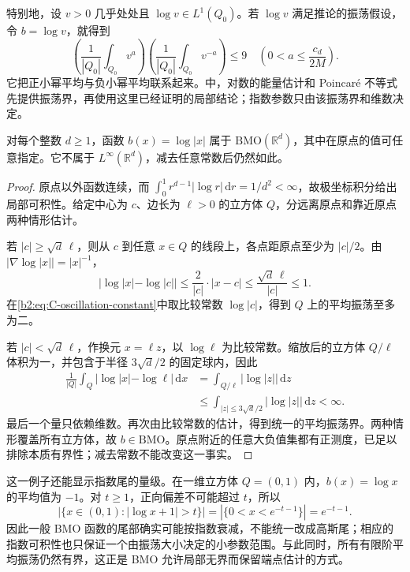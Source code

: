 特别地，设 \(v>0\) 几乎处处且 \(\log v\in L^1(Q_0)\)。若 \(\log v\) 满足推论的振荡假设，令 \(b=\log v\)，就得到
\[
 \left(\frac1{|Q_0|}\int_{Q_0}v^a\right)
 \left(\frac1{|Q_0|}\int_{Q_0}v^{-a}\right)\leq9
 \quad\left(0<a\leq\frac{c_d}{2M}\right).
\]
它把正小幂平均与负小幂平均联系起来。中，对数的能量估计和 Poincaré 不等式先提供振荡界，再使用这里已经证明的局部结论；指数参数只由该振荡界和维数决定。

\begin{proposition}[无界的对数例子]\label{b2:prop:C-log-bmo}
对每个整数 \(d\geq1\)，函数 \(b(x)=\log|x|\) 属于 \(\mathrm{BMO}(\mathbb R^d)\)，其中在原点的值可任意指定。它不属于 \(L^\infty(\mathbb R^d)\)，减去任意常数后仍然如此。
\end{proposition}
\begin{proof}
原点以外函数连续，而
\(\int_0^1r^{d-1}|\log r|\,\mathrm dr=1/d^2<\infty\)，故极坐标积分给出局部可积性。给定中心为 \(c\)、边长为 \(\ell>0\) 的立方体 \(Q\)，分远离原点和靠近原点两种情形估计。

若 \(|c|\geq\sqrt d\,\ell\)，则从 \(c\) 到任意 \(x\in Q\) 的线段上，各点距原点至少为 \(|c|/2\)。由 \(|\nabla\log|x||=|x|^{-1}\)，
\[
 |\log|x|-\log|c||
 \leq\frac2{|c|}\cdot|x-c|
 \leq\frac{\sqrt d\,\ell}{|c|}\leq1.
\]
在\eqref{b2:eq:C-oscillation-constant}中取比较常数 \(\log|c|\)，得到 \(Q\) 上的平均振荡至多为二。

若 \(|c|<\sqrt d\,\ell\)，作换元 \(x=\ell z\)，以 \(\log\ell\) 为比较常数。缩放后的立方体 \(Q/\ell\) 体积为一，并包含于半径 \(3\sqrt d/2\) 的固定球内，因此
\[
 \begin{aligned}
 \frac1{|Q|}\int_Q|\log|x|-\log\ell|\,\mathrm dx
 &=\int_{Q/\ell}|\log|z||\,\mathrm dz\\
 &\leq\int_{|z|\leq3\sqrt d/2}|\log|z||\,\mathrm dz
 <\infty.
 \end{aligned}
\]
最后一个量只依赖维数。再次由比较常数的估计，得到统一的平均振荡界。两种情形覆盖所有立方体，故 \(b\in\mathrm{BMO}\)。原点附近的任意大负值集都有正测度，已足以排除本质有界性；减去常数不能改变这一事实。
\end{proof}
这一例子还能显示指数尾的量级。在一维立方体 \(Q=(0,1)\) 内，\(b(x)=\log x\) 的平均值为 \(-1\)。对 \(t\geq1\)，正向偏差不可能超过 \(t\)，所以
\[
 |\{x\in(0,1):|\log x+1|>t\}|
 =|\{0<x<e^{-t-1}\}|=e^{-t-1}.
\]
因此一般 BMO 函数的尾部确实可能按指数衰减，不能统一改成高斯尾；相应的指数可积性也只保证一个由振荡大小决定的小参数范围。与此同时，所有有限阶平均振荡仍然有界，这正是 BMO 允许局部无界而保留端点估计的方式。


